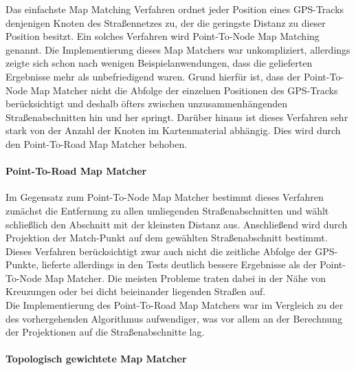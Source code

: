 \documentclass[a4paper]{scrartcl}
\begin{document}
Das einfachste Map Matching Verfahren ordnet jeder Position eines GPS-Tracks denjenigen Knoten des Straßennetzes zu, der die geringste Distanz zu dieser Position besitzt. Ein solches Verfahren wird Point-To-Node Map Matching genannt. Die Implementierung dieses Map Matchers war unkompliziert, allerdings zeigte sich schon nach wenigen Beispielanwendungen, dass die gelieferten Ergebnisse mehr als unbefriedigend waren. Grund hierfür ist, dass der Point-To-Node Map Matcher nicht die Abfolge der einzelnen Positionen des GPS-Tracks berücksichtigt und deshalb öfters zwischen unzusammenhängenden Straßenabschnitten hin und her springt. Darüber hinaus ist dieses Verfahren sehr stark von der Anzahl der Knoten im Kartenmaterial abhängig. Dies wird durch den Point-To-Road Map Matcher behoben. 


\paragraph{Point-To-Road Map Matcher}
\label{sec:point-road-map}

Im Gegensatz zum Point-To-Node Map Matcher bestimmt dieses Verfahren zunächst die Entfernung zu allen umliegenden Straßenabschnitten und wählt schließlich den Abschnitt mit der kleinsten Distanz aus. Anschließend wird durch Projektion der Match-Punkt auf dem gewählten Straßenabschnitt bestimmt. 
Dieses Verfahren berücksichtigt zwar auch nicht die zeitliche Abfolge der GPS-Punkte, lieferte allerdings in den Tests deutlich bessere Ergebnisse als der Point-To-Node Map Matcher. Die meisten Probleme traten dabei in der Nähe von Kreuzungen oder bei dicht beieinander liegenden Straßen auf. \\
Die Implementierung des Point-To-Road Map Matchers war im Vergleich zu der des vorhergehenden Algorithmus aufwendiger, was vor allem an der Berechnung der Projektionen auf die Straßenabschnitte lag. 


\paragraph{Topologisch gewichtete Map Matcher}
\label{sec:topol-gewicht-map}
\end{document}
